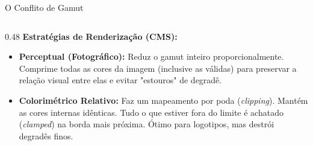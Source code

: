 \begin{frame}{O Conflito de Gamut}
{\begin{columns}[T]
            \begin{column}{0.48\textwidth}    
                \scriptsize
                \textbf{Estratégias de Renderização (CMS):}
                \begin{itemize}
                    \setlength{\itemsep}{1pt}
                    \item \textbf{Perceptual (Fotográfico):} Reduz o gamut inteiro proporcionalmente. Comprime todas as cores da imagem (inclusive as válidas) para preservar a relação visual entre elas e evitar "estouros" de degradê.
                    \item \textbf{Colorimétrico Relativo:} Faz um mapeamento por poda (\textit{clipping}). Mantém as cores internas idênticas. Tudo o que estiver fora do limite é achatado (\textit{clamped}) na borda mais próxima. Ótimo para logotipos, mas destrói degradês finos.
                \end{itemize}
            \end{column}
        \end{columns}   
    }
\end{frame}